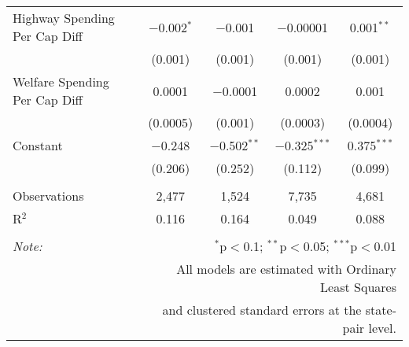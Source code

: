 \begin{table}[!htbp]
\begin{tabular}{@{\extracolsep{5pt}}lcccc}
  Highway Spending Per Cap Diff & $-$0.002$^{*}$ & $-$0.001 & $-$0.00001 & 0.001$^{**}$ \\ 
  & (0.001) & (0.001) & (0.001) & (0.001) \\ 
  Welfare Spending Per Cap Diff & 0.0001 & $-$0.0001 & 0.0002 & 0.001 \\ 
  & (0.0005) & (0.001) & (0.0003) & (0.0004) \\ 
  Constant & $-$0.248 & $-$0.502$^{**}$ & $-$0.325$^{***}$ & 0.375$^{***}$ \\ 
  & (0.206) & (0.252) & (0.112) & (0.099) \\ 
 \hline \\[-1.8ex] 
Observations & 2,477 & 1,524 & 7,735 & 4,681 \\ 
R$^{2}$ & 0.116 & 0.164 & 0.049 & 0.088 \\ 
\hline 
\hline \\[-1.8ex] 
\textit{Note:}  & \multicolumn{4}{r}{$^{*}$p$<$0.1; $^{**}$p$<$0.05; $^{***}$p$<$0.01} \\ 
 & \multicolumn{4}{r}{All models are estimated with Ordinary Least Squares} \\ 
 & \multicolumn{4}{r}{and clustered standard errors at the state-pair level.} \\ 
\end{tabular} 
\end{table} 
